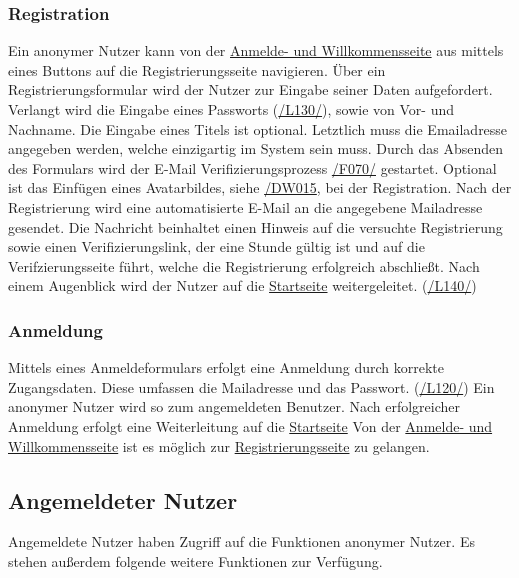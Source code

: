 \subsubsection{Registration}\label{an:reg}
\begin{description}
     Ein anonymer Nutzer kann von der \hyperref[an:log]{Anmelde- und Willkommensseite} aus mittels eines
    Buttons auf die Registrierungsseite navigieren.
     Über ein Registrierungsformular wird der Nutzer zur Eingabe seiner
    Daten aufgefordert. Verlangt wird die Eingabe eines Passworts (\hyperref[leist:130]{/L130/}),
    sowie von Vor- und Nachname. Die Eingabe eines Titels ist optional. Letztlich muss die Emailadresse
    angegeben werden, welche einzigartig im System sein muss. Durch das Absenden des Formulars wird der E-Mail Verifizierungsprozess
    \hyperref[funkt:070]{/F070/} gestartet.
     Optional ist das Einfügen eines Avatarbildes, siehe \hyperref[d015]{/DW015},
    bei der Registration.
     Nach der Registrierung wird eine automatisierte E-Mail
    an die angegebene Mailadresse gesendet. Die Nachricht beinhaltet einen Hinweis auf
    die versuchte Registrierung sowie einen Verifizierungslink, der eine Stunde gültig ist und auf die Verifzierungsseite führt, welche
    die Registrierung erfolgreich abschließt. Nach einem Augenblick wird der Nutzer
    auf die \hyperref[nut:start]{Startseite} weitergeleitet. (\hyperref[leist:140]{/L140/})
\end{description}

\subsubsection{Anmeldung}\label{an:log}
\begin{description}
     Mittels eines Anmeldeformulars erfolgt eine Anmeldung durch korrekte Zugangsdaten.
    Diese umfassen die Mailadresse und das Passwort. (\hyperref[leist:120]{/L120/})
    Ein anonymer Nutzer wird so zum angemeldeten Benutzer.
    Nach erfolgreicher Anmeldung erfolgt eine Weiterleitung auf die \hyperref[nut:start]{Startseite}
     Von der \hyperref[an:log]{Anmelde- und Willkommensseite} ist es möglich zur \hyperref[an:reg]{Registrierungsseite} zu gelangen.
\end{description}

\subsection{Angemeldeter Nutzer}
Angemeldete Nutzer haben Zugriff auf die Funktionen anonymer Nutzer.
Es stehen außerdem folgende weitere Funktionen zur Verfügung.

